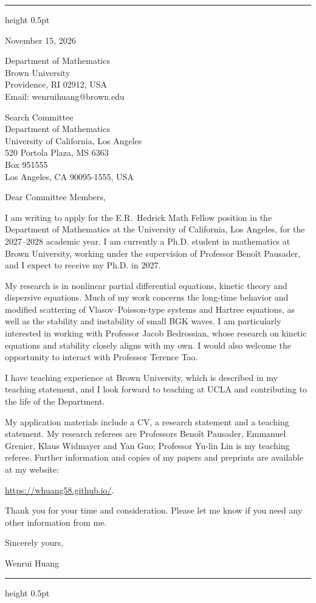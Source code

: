 \documentclass[10pt]{article}
\begin{document}
\vspace{0.08in}
\hrule height 0.5pt

\vspace{0.47in}
\hfill
\begin{minipage}{2.27in}
November 15, 2026

\vspace{0.16in}
Department of Mathematics\\
Brown University\\
Providence, RI 02912, USA\\
Email: wenrui\textunderscore huang@brown.edu
\end{minipage}

\vspace{0.30in}
Search Committee\\
Department of Mathematics\\
University of California, Los Angeles\\
520 Portola Plaza, MS 6363\\
Box 951555\\
Los Angeles, CA 90095-1555, USA

\vspace{0.16in}
Dear Committee Members,

I am writing to apply for the E.R.\ Hedrick Math Fellow position in the Department of Mathematics at the University of California, Los Angeles, for the 2027--2028 academic year. I am currently a Ph.D. student in mathematics at Brown University, working under the supervision of Professor Beno\^{i}t Pausader, and I expect to receive my Ph.D. in 2027.

My research is in nonlinear partial differential equations, kinetic theory and dispersive equations. Much of my work concerns the long-time behavior and modified scattering of Vlasov--Poisson-type systems and Hartree equations, as well as the stability and instability of small BGK waves. I am particularly interested in working with Professor Jacob Bedrossian, whose research on kinetic equations and stability closely aligns with my own. I would also welcome the opportunity to interact with Professor Terence Tao.

I have teaching experience at Brown University, which is described in my teaching statement, and I look forward to teaching at UCLA and contributing to the life of the Department.

My application materials include a CV, a research statement and a teaching statement. My research referees are Professors Beno\^{i}t Pausader, Emmanuel Grenier, Klaus Widmayer and Yan Guo; Professor Yu-lin Lin is my teaching referee. Further information and copies of my papers and preprints are available at my website:

\url{https://whuang58.github.io/}.

\medskip
Thank you for your time and consideration. Please let me know if you need any other information from me.

\vspace{0.12in}
Sincerely yours,

\vspace{0.12in}
Wenrui Huang

\vfill
\hrule height 0.5pt
\end{document}
